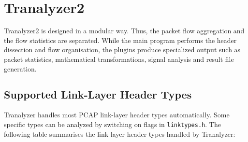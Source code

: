 \section{Tranalyzer2}\label{s:tranalyzer2}
Tranalyzer2 is designed in a modular way. Thus, the packet flow aggregation and the flow statistics are separated. While the main program performs the header dissection and flow organisation, the plugins produce specialized output such as packet statistics, mathematical transformations, signal analysis and result file generation.

\subsection{Supported Link-Layer Header Types}
Tranalyzer handles most PCAP link-layer header types automatically. Some specific types can be analyzed by switching on flags in {\tt linktypes.h}. The following table summarises the link-layer header types handled by Tranalyzer:
